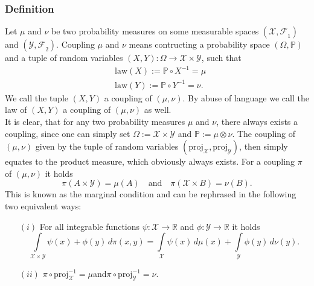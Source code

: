 \documentclass[11pt,a4paper]{article}
\begin{document}
\subsubsection{Definition}
Let $\mu$ and $\nu$ be two probability measures on some measurable spaces $(\mathcal{X,F}_1)$ and $(\mathcal{Y,F}_2)$. Coupling $\mu$ and $\nu$ means contructing a probability space $(\Omega,\mathbb{P})$ and a tuple of random variables $(X,Y):\Omega\rightarrow\mathcal{X\times{}Y}$, such that 
\begin{align*}
&\text{law}(X):=\mathbb{P}\circ{}X^{-1}=\mu \\[1.5pt]&\text{law}(Y):=\mathbb{P}\circ{}Y^{-1}=\nu.
\end{align*}
We call the tuple $(X,Y)$ a coupling of $(\mu,\nu)$. By abuse of language we call the law of $(X,Y)$ a coupling of $(\mu,\nu)$ as well. \vspace{1em}\\
It is clear, that for any two probability measures $\mu$ and $\nu$, there always exists a coupling, since one can simply set $\Omega:=\mathcal{X\times{}Y}$ and $\mathbb{P}:=\mu\otimes\nu$. The coupling of $(\mu,\nu)$ given by the tuple of random variables $(\text{proj}_{\mathcal{X}},\text{proj}_{\mathcal{Y}})$, then simply equates to the product measure, which obviously always exists. For a coupling $\pi$ of $(\mu,\nu)$ it holds 
\[
\pi(A\times\mathcal{Y}) = \mu(A)\quad\text{and}\quad\pi(\mathcal{X}\times{}B)=\nu(B).
\]
This is known as the marginal condition and can be rephrased in the following two equivalent ways:
\begin{itemize}
\item[$(i)$] \quad For all integrable functions $\psi:\mathcal{X}\rightarrow\mathbb{R}$ and $\phi:\mathcal{Y}\rightarrow\mathbb{R}$ it holds 
\[
\int\limits_{\mathcal{X\times{}Y}}\psi(x)+\phi(y)\,d\pi(x,y) = \int\limits_{\mathcal{X}}\psi(x)\,d\mu(x) + \int\limits_{\mathcal{Y}}\phi(y)\,d\nu(y).
\]
\item[$(ii)$] \quad $\pi\circ{}\text{proj}_{\mathcal{X}}^{-1} = \mu$\quad and\quad $\pi\circ{}\text{proj}_{\mathcal{Y}}^{-1} = \nu.$
\end{itemize}
\end{document}
